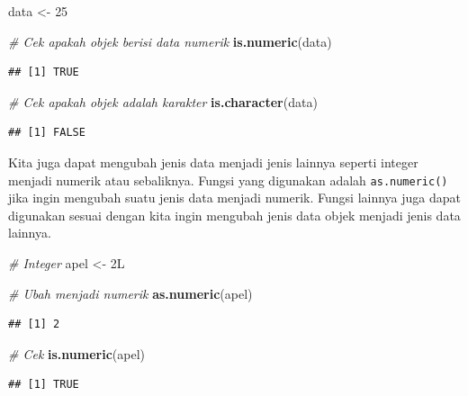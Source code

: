 \documentclass[]{book}
\newenvironment{Shaded}{\begin{snugshade}}{\end{snugshade}}
\newcommand{\KeywordTok}[1]{\textcolor[rgb]{0.13,0.29,0.53}{\textbf{#1}}}
\newcommand{\DecValTok}[1]{\textcolor[rgb]{0.00,0.00,0.81}{#1}}
\newcommand{\StringTok}[1]{\textcolor[rgb]{0.31,0.60,0.02}{#1}}
\newcommand{\CommentTok}[1]{\textcolor[rgb]{0.56,0.35,0.01}{\textit{#1}}}
\newcommand{\NormalTok}[1]{#1}
\begin{document}
\begin{Shaded}
\begin{Highlighting}[]
\NormalTok{data <-}\StringTok{ }\DecValTok{25}

\CommentTok{# Cek apakah objek berisi data numerik}
\KeywordTok{is.numeric}\NormalTok{(data)}
\end{Highlighting}
\end{Shaded}

\begin{verbatim}
## [1] TRUE
\end{verbatim}

\begin{Shaded}
\begin{Highlighting}[]
\CommentTok{# Cek apakah objek adalah karakter}
\KeywordTok{is.character}\NormalTok{(data)}
\end{Highlighting}
\end{Shaded}

\begin{verbatim}
## [1] FALSE
\end{verbatim}

Kita juga dapat mengubah jenis data menjadi jenis lainnya seperti
integer menjadi numerik atau sebaliknya. Fungsi yang digunakan adalah
\texttt{as.numeric()} jika ingin mengubah suatu jenis data menjadi
numerik. Fungsi lainnya juga dapat digunakan sesuai dengan kita ingin
mengubah jenis data objek menjadi jenis data lainnya.

\begin{Shaded}
\begin{Highlighting}[]
\CommentTok{# Integer}
\NormalTok{apel <-}\StringTok{ }\NormalTok{2L}

\CommentTok{# Ubah menjadi numerik}
\KeywordTok{as.numeric}\NormalTok{(apel)}
\end{Highlighting}
\end{Shaded}

\begin{verbatim}
## [1] 2
\end{verbatim}

\begin{Shaded}
\begin{Highlighting}[]
\CommentTok{# Cek}
\KeywordTok{is.numeric}\NormalTok{(apel)}
\end{Highlighting}
\end{Shaded}

\begin{verbatim}
## [1] TRUE
\end{verbatim}
\end{document}

